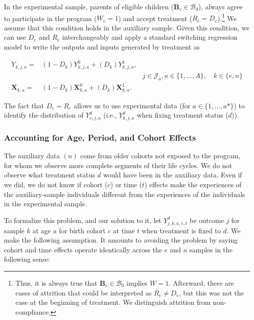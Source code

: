 In the experimental sample, parents of eligible children ($\bm{B}_e \in \mathcal{B}_{0}$), always agree to participate in the program ($W_e = 1$) and accept treatment ($R_e = D_e$).\footnote{Thus, it is always true that $\bm{B}_e \in \mathcal{B}_{0}$ implies $W = 1$. Afterward, there are cases of attrition that could be interpreted as $R_e \neq D_e$, but this was not the case at the beginning of treatment. We distinguish attrition from non-compliance.} We assume that this condition holds in the auxiliary sample. Given this condition, we can use $D_e$ and $R_e$ interchangeably and apply a standard \citet{Quandt_1972_JASA} switching regression model to write the outputs and inputs generated by treatment as
\begin{spacing}{1}
\begin{align}\label{eq:countersystem}
Y_{k,j,a} =& \left( 1 - D_k \right) Y_{k,j,a}^0 + \left( D_k \right) Y_{k,j,a}^1, \\
&&j \in \mathcal{J}_a, a \in \{1,\dots,A\}, \quad k \in \{e,n\} \nonumber \\
\bm{X}_{k,a} =& \left( 1 - D_k \right) \bm{X}_{k,a}^0 + \left( D_k \right) \bm{X}_{k,a}^1. \nonumber
\end{align}
\end{spacing}

\noindent The fact that $D_e = R_e$ allows us to use experimental data (for $a \in \{1, \dots,a*\}$) to identify the distribution of $Y_{e,j,a}^d$ (i.e., $Y_{k,j,a}^d$ when fixing treatment status ($d$)).

\subsubsection{Accounting for Age, Period, and Cohort Effects}

The auxiliary data $(n)$ come from older cohorts not exposed to the program, for whom we observe more complete segments of their life cycles. We do not observe what treatment status $d$ would have been in the auxiliary data. Even if we did, we do not know if cohort ($c$) or time ($t$) effects make the experiences of the auxiliary-sample individuals different from the experiences of the individuals in the experimental sample.

To formalize this problem, and our solution to it, let $Y_{j,k,a,c,t}^d$ be outcome $j$ for sample $k$ at age $a$ for birth cohort $c$ at time $t$ when treatment is fixed to $d$. We make the following assumption. It amounts to avoiding the problem by saying cohort and time effects operate identically across the $e$ and $n$ samples in the following sense:

